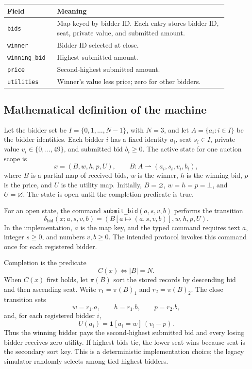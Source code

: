 \documentclass[11pt]{article}
\begin{document}
\begin{longtable}{p{0.20\linewidth}p{0.70\linewidth}}
\toprule
Field & Meaning \\
\midrule
\endhead
\texttt{bids} & Map keyed by bidder ID. Each entry stores bidder ID, seat, private value, and submitted amount. \\
\texttt{winner} & Bidder ID selected at close. \\
\texttt{winning\_bid} & Highest submitted amount. \\
\texttt{price} & Second-highest submitted amount. \\
\texttt{utilities} & Winner's value less price; zero for other bidders. \\
\bottomrule
\end{longtable}

\subsection{Mathematical definition of the machine}

Let the bidder set be $I=\{0,1,\ldots,N-1\}$, with $N=3$, and let $A=\{a_i:i\in I\}$ be the bidder identities. Each bidder $i$ has a fixed identity $a_i$, seat $s_i\in I$, private value $v_i\in\{0,\ldots,49\}$, and submitted bid $b_i\geq 0$. The active state for one auction scope is
\[
  x=(B,w,h,p,U), \qquad B:A\rightharpoonup (a_i,s_i,v_i,b_i),
\]
where $B$ is a partial map of received bids, $w$ is the winner, $h$ is the winning bid, $p$ is the price, and $U$ is the utility map. Initially, $B=\varnothing$, $w=h=p=\bot$, and $U=\varnothing$. The state is open until the completion predicate is true.

For an open state, the command \texttt{submit\_bid}$(a,s,v,b)$ performs the transition
\[
  \delta_{\mathrm{bid}}(x;a,s,v,b)
  = (B[a\mapsto(a,s,v,b)],w,h,p,U).
\]
In the implementation, $a$ is the map key, and the typed command requires text $a$, integer $s\geq0$, and numbers $v,b\geq0$. The intended protocol invokes this command once for each registered bidder.

Completion is the predicate
\[
  C(x)\iff |B|=N.
\]
When $C(x)$ first holds, let $\pi(B)$ sort the stored records by descending bid and then ascending seat. Write $r_1=\pi(B)_1$ and $r_2=\pi(B)_2$. The close transition sets
\[
  w=r_1.a,\qquad h=r_1.b,\qquad p=r_2.b,
\]
and, for each registered bidder $i$,
\[
  U(a_i)=\mathbf{1}[a_i=w]\,(v_i-p).
\]
Thus the winning bidder pays the second-highest submitted bid and every losing bidder receives zero utility. If highest bids tie, the lower seat wins because seat is the secondary sort key. This is a deterministic implementation choice; the legacy simulator randomly selects among tied highest bidders.
\end{document}

